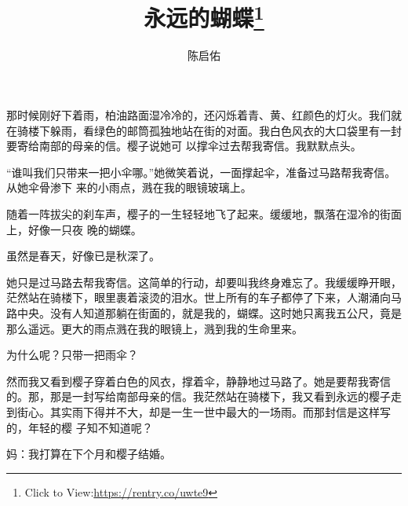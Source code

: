 \documentclass{article}
\title{永远的蝴蝶\footnote{Click to View:\url{https://rentry.co/uwte9}}}
\author{陈启佑}
\date{}
\begin{document}

\maketitle


\Large

﻿那时候刚好下着雨，柏油路面湿冷冷的，还闪烁着青、黄、红颜色的灯火。我们就在骑楼下躲雨，看绿色的邮筒孤独地站在街的对面。我白色风衣的大口袋里有一封要寄给南部的母亲的信。樱子说她可
以撑伞过去帮我寄信。我默默点头。 

“谁叫我们只带来一把小伞哪。”她微笑着说，一面撑起伞，准备过马路帮我寄信。从她伞骨渗下
来的小雨点，溅在我的眼镜玻璃上。 

随着一阵拔尖的刹车声，樱子的一生轻轻地飞了起来。缓缓地，飘落在湿冷的街面上，好像一只夜
晚的蝴蝶。 


\newpage

虽然是春天，好像已是秋深了。 

她只是过马路去帮我寄信。这简单的行动，却要叫我终身难忘了。我缓缓睁开眼，茫然站在骑楼下，眼里裹着滚烫的泪水。世上所有的车子都停了下来，人潮涌向马路中央。没有人知道那躺在街面的，就是我的，蝴蝶。这时她只离我五公尺，竟是那么遥远。更大的雨点溅在我的眼镜上，溅到我的生命里来。
 


为什么呢？只带一把雨伞？ 

然而我又看到樱子穿着白色的风衣，撑着伞，静静地过马路了。她是要帮我寄信的。那，那是一封写给南部母亲的信。我茫然站在骑楼下，我又看到永远的樱子走到街心。其实雨下得并不大，却是一生一世中最大的一场雨。而那封信是这样写的，年轻的樱
子知不知道呢？ 

妈：我打算在下个月和樱子结婚。
\end{document}
